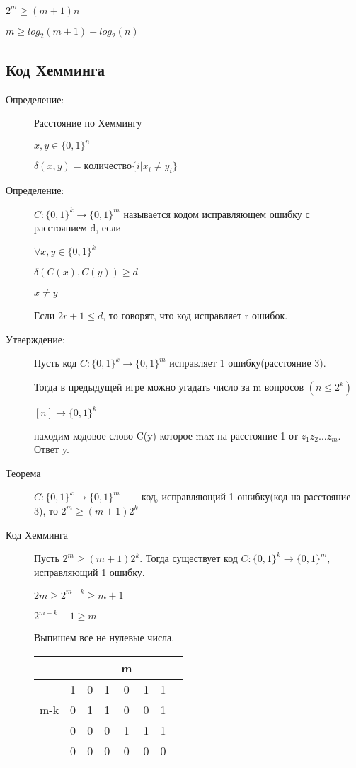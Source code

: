 \documentclass[12pt]{article}
\begin{document}
\begin{description}
\begin{description}
$2^m \ge (m + 1)n$

$m \ge log_2(m + 1) + log_2(n)$
\end{description}

\subsection{Код Хемминга}
\begin{description}
\item[Определение:] Расстояние по Хеммингу

 $x, y \in \{0, 1\}^n$

$\delta (x, y) = количество \{i| x_i \ne y_i\}$

\item[Определение:] $C: \{0, 1\}^k \to \{0, 1\}^m$ называется кодом исправляющем ошибку с расстоянием d, если 

$\forall x, y \in \{0, 1\}^k$

$\delta (C(x), C(y)) \ge d$

$x \ne y$

Если $2r + 1 \le d$, то говорят, что код исправляет r ошибок. 

\item[Утверждение:] Пусть код $C:\{0, 1\}^k \to \{0, 1\}^m$ исправляет 1 ошибку(расстояние 3).

Тогда в предыдущей игре можно угадать число за m вопросов $(n \le 2^k)$

$[n] \to  \{0, 1\}^k$

находим кодовое слово C(y) которое max на расстояние 1 от $z_1 z_2 \ldots z_m$. Ответ y.

\item[Теорема] $C:\{0, 1\}^k \to \{0, 1\}^m$ ~--- код, исправляющий 1 ошибку(код на расстояние 3), то $2^m \ge (m + 1)2^k$

\item[Код Хемминга]

Пусть $2^m \ge (m + 1)2^k$. Тогда существует код $C:\{0, 1\}^k \to \{0, 1\}^m$, исправляющий 1 ошибку. 

$2m \ge 2^{m - k} \ge m + 1$

$2^{m - k} - 1 \ge m$

Выпишем все не нулевые числа.

\begin{tabular}{|c|c|c|c|c|c|c|c|}
\hline
&&&&m&&&\\
\hline
&1&0&1&0&1&1&\\
m-k&0&1&1&0&0&1&\\
&0&0&0&1&1&1&\\
&0&0&0&0&0&0&\\
\hline
\end{tabular}


\end{description}
\end{description}
\end{document}
